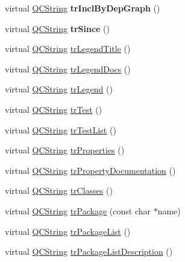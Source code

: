 \begin{DoxyCompactItemize}
virtual \mbox{\hyperlink{class_q_c_string}{Q\+C\+String}} {\bfseries tr\+Incl\+By\+Dep\+Graph} ()
\item 
\mbox{\label{class_translator_japanese_aaba5780efec4ed3fdff59628a0d452e2}} 
virtual \mbox{\hyperlink{class_q_c_string}{Q\+C\+String}} {\bfseries tr\+Since} ()
\item 
virtual \mbox{\hyperlink{class_q_c_string}{Q\+C\+String}} \mbox{\hyperlink{class_translator_japanese_a51f0d8b9dcc0f2062396e6684e5a1b33}{tr\+Legend\+Title}} ()
\item 
virtual \mbox{\hyperlink{class_q_c_string}{Q\+C\+String}} \mbox{\hyperlink{class_translator_japanese_a3e6100664d0cca416bc9c36eb6ed7aab}{tr\+Legend\+Docs}} ()
\item 
virtual \mbox{\hyperlink{class_q_c_string}{Q\+C\+String}} \mbox{\hyperlink{class_translator_japanese_a50d8792e98dbd99347bf81cd6cb59bd2}{tr\+Legend}} ()
\item 
virtual \mbox{\hyperlink{class_q_c_string}{Q\+C\+String}} \mbox{\hyperlink{class_translator_japanese_a41a3f9a92f3abdccdc791388d040e794}{tr\+Test}} ()
\item 
virtual \mbox{\hyperlink{class_q_c_string}{Q\+C\+String}} \mbox{\hyperlink{class_translator_japanese_a4df1657534bc411aabdc8e7edc399e5a}{tr\+Test\+List}} ()
\item 
virtual \mbox{\hyperlink{class_q_c_string}{Q\+C\+String}} \mbox{\hyperlink{class_translator_japanese_ae003f3fae0dbdbdd541274d665804a45}{tr\+Properties}} ()
\item 
virtual \mbox{\hyperlink{class_q_c_string}{Q\+C\+String}} \mbox{\hyperlink{class_translator_japanese_a45c643c6e836843a45bf02695217a98a}{tr\+Property\+Documentation}} ()
\item 
virtual \mbox{\hyperlink{class_q_c_string}{Q\+C\+String}} \mbox{\hyperlink{class_translator_japanese_ad84cb0b3598d4fbec1959b9e664c5714}{tr\+Classes}} ()
\item 
virtual \mbox{\hyperlink{class_q_c_string}{Q\+C\+String}} \mbox{\hyperlink{class_translator_japanese_afd3280d43c7c68278671b3084b05bf72}{tr\+Package}} (const char $\ast$name)
\item 
virtual \mbox{\hyperlink{class_q_c_string}{Q\+C\+String}} \mbox{\hyperlink{class_translator_japanese_ae510018bf6da333f8e7e35459a99c42c}{tr\+Package\+List}} ()
\item 
virtual \mbox{\hyperlink{class_q_c_string}{Q\+C\+String}} \mbox{\hyperlink{class_translator_japanese_afed2a6851ca809632d284d331ea0c4e3}{tr\+Package\+List\+Description}} ()

\end{DoxyCompactItemize}
